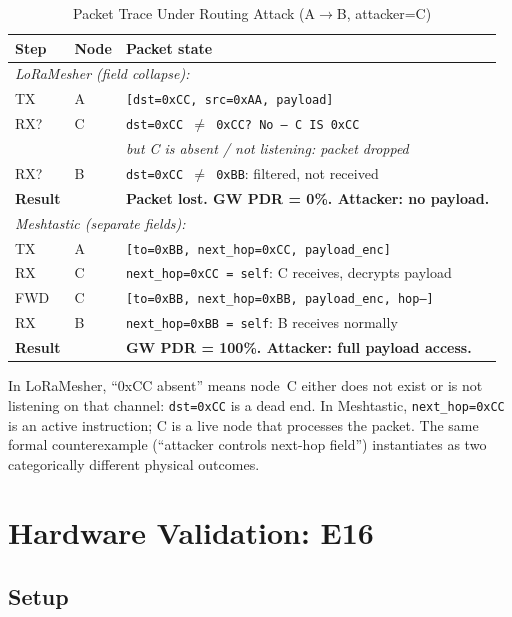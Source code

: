 \documentclass[journal]{IEEEtran}
\begin{document}
\begin{table}[h]
  \centering
  \caption{Packet Trace Under Routing Attack (A$\to$B, attacker=C)}
  \label{tab:trace}
  \small
  \begin{tabular}{p{1.0cm}p{1.9cm}p{4.5cm}}
    \toprule
    Step & Node & Packet state \\
    \midrule
    \multicolumn{3}{l}{\textit{LoRaMesher (field collapse):}} \\
    TX & A & \texttt{[dst=0xCC, src=0xAA, payload]} \\
    RX? & C & \texttt{dst=0xCC $\neq$ 0xCC? No --- C IS 0xCC} \\
         &   & \textit{but C is absent / not listening: packet dropped} \\
    RX? & B & \texttt{dst=0xCC $\neq$ 0xBB}: filtered, not received \\
    \textbf{Result} & & \textbf{Packet lost. GW PDR = 0\%. Attacker: no payload.} \\
    \midrule
    \multicolumn{3}{l}{\textit{Meshtastic (separate fields):}} \\
    TX & A & \texttt{[to=0xBB, next\_hop=0xCC, payload\_enc]} \\
    RX & C & \texttt{next\_hop=0xCC = self}: C receives, decrypts payload \\
    FWD & C & \texttt{[to=0xBB, next\_hop=0xBB, payload\_enc, hop--]} \\
    RX & B & \texttt{next\_hop=0xBB = self}: B receives normally \\
    \textbf{Result} & & \textbf{GW PDR = 100\%. Attacker: full payload access.} \\
    \bottomrule
  \end{tabular}
\end{table}

In LoRaMesher, ``0xCC absent'' means node~C either does not exist or
is not listening on that channel: \texttt{dst=0xCC} is a dead end.
In Meshtastic, \texttt{next\_hop=0xCC} is an active instruction; C is
a live node that processes the packet. The same formal counterexample
(``attacker controls next-hop field'') instantiates as two categorically
different physical outcomes.

\section{Hardware Validation: E16}
\label{sec:e16}

\subsection{Setup}
\end{document}
